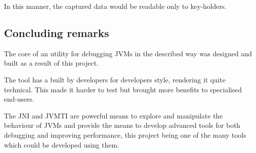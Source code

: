 In this manner, the captured data would be readable only to key-holders.

\subsection{Concluding remarks}
The core of an utility for debugging JVMs in the described way was designed and built as a result of this project.

The tool has a built by developers for developers style, rendering it quite technical. This made it harder to test but brought more benefits to specialised end-users.

The JNI and JVMTI are powerful means to explore and manipulate the behaviour of JVMs and provide the means to develop advanced tools for both debugging and improving performance, this project being one of the many tools which could be developed using them.
\newpage